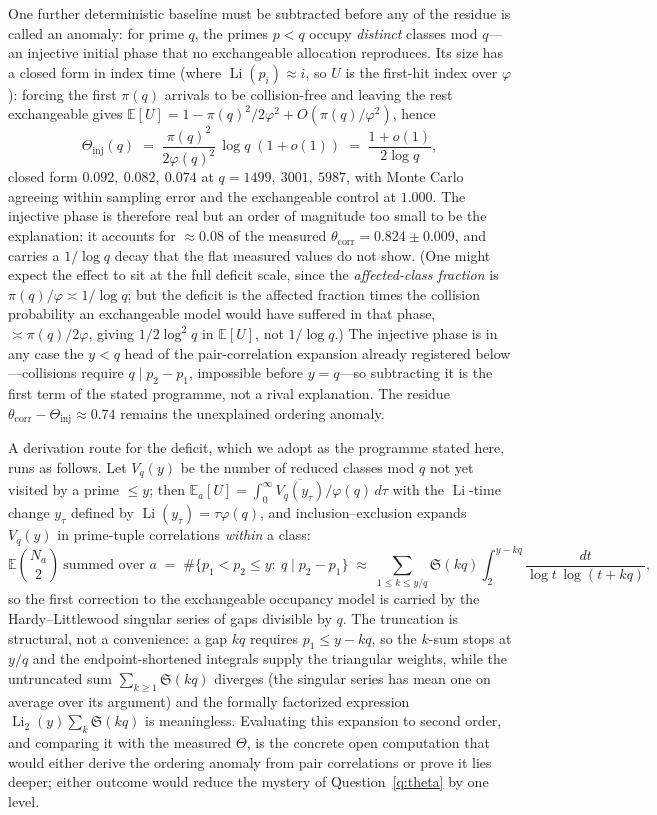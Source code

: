 \documentclass[11pt]{article}
\theoremstyle{definition}
\newcommand{\Li}{\operatorname{Li}}
\newcommand{\SG}{\mathfrak S}
\begin{document}
One further deterministic baseline must be subtracted before any of
the residue is called an anomaly: for prime $q$, the primes $p<q$
occupy
\emph{distinct} classes mod $q$---an injective initial phase that no
exchangeable allocation reproduces.  Its size has a closed form in
index time (where $\Li(p_i)\approx i$, so $U$ is the first-hit index
over $\varphi$): forcing the first $\pi(q)$ arrivals to be
collision-free and leaving the rest exchangeable gives
$\mathbb E[U]=1-\pi(q)^2/2\varphi^2+O(\pi(q)/\varphi^2)$, hence
\[
\Theta_{\mathrm{inj}}(q)
\;=\;\frac{\pi(q)^2}{2\varphi(q)^2}\,\log q\;(1+o(1))
\;=\;\frac{1+o(1)}{2\log q},
\]
closed form $0.092,\ 0.082,\ 0.074$ at $q=1499,\ 3001,\ 5987$, with
Monte Carlo agreeing within sampling error and the exchangeable
control at $1.000$.
The injective phase is therefore real but an order of magnitude too
small to be the explanation: it accounts for ${\approx}0.08$ of the
measured $\theta_{\mathrm{corr}}=0.824\pm0.009$, and carries a
$1/\log q$ decay that the flat measured values do not show.  (One might
expect the effect
to sit at the full deficit scale, since the \emph{affected-class
fraction} is $\pi(q)/\varphi\asymp1/\log q$; but the deficit is the affected
fraction times the collision
probability an exchangeable model would have suffered in that phase,
$\asymp\pi(q)/2\varphi$, giving $1/2\log^2q$ in $\mathbb E[U]$, not
$1/\log q$.)  The injective phase is in any case the $y<q$ head of
the pair-correlation expansion already registered below---collisions
require $q\mid p_2-p_1$, impossible before $y=q$---so subtracting it
is the first term of the stated programme, not a rival explanation.
The residue $\theta_{\mathrm{corr}}-\Theta_{\mathrm{inj}}
\approx0.74$ remains the unexplained ordering anomaly.

A derivation route for the deficit, which we adopt as the programme
stated here, runs as follows.  Let $V_q(y)$ be the number of reduced
classes mod $q$ not
yet visited by a prime $\le y$; then
$\mathbb E_a[U]=\int_0^\infty \overline{V_q(y_\tau)}/\varphi(q)\,
d\tau$ with the $\Li$-time change $y_\tau$ defined by
$\Li(y_\tau)=\tau\varphi(q)$, and inclusion--exclusion expands
$V_q(y)$ in prime-tuple correlations \emph{within} a class:
\[
\mathbb E\binom{N_a}{2}\ \text{summed over }a
\;=\;\#\{p_1<p_2\le y:\ q\mid p_2-p_1\}
\;\approx\;\sum_{1\le k\le y/q}\SG(kq)
\int_2^{y-kq}\frac{dt}{\log t\,\log(t+kq)},
\]
so the first correction to the exchangeable occupancy model is
carried by the Hardy--Littlewood singular series of gaps divisible by
$q$.  The truncation is structural, not a convenience: a gap $kq$
requires $p_1\le y-kq$, so the $k$-sum stops at $y/q$ and the
endpoint-shortened integrals supply the triangular weights, while the
untruncated sum $\sum_{k\ge1}\SG(kq)$ diverges (the singular series
has mean one on average over its argument) and the formally
factorized expression $\Li_2(y)\sum_k\SG(kq)$ is meaningless.  Evaluating this expansion to second order, and comparing it
with the measured $\Theta$, is the concrete open computation that
would either derive the ordering anomaly from pair correlations or
prove it lies deeper; either outcome would reduce the mystery of
Question~\ref{q:theta} by one level.
\end{document}
